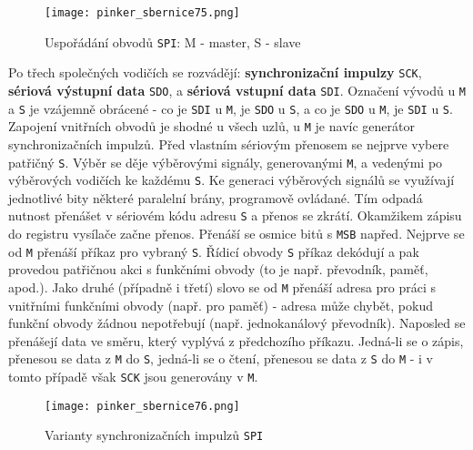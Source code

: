         \begin{figure}[ht!] %
          \centering
          \texttt{[image: pinker\_sbernice75.png]}
          \caption{Uspořádání obvodů \texttt{SPI}: M - master, S - slave}
          \label{MIT:fig_sbernice75}
        \end{figure}
        
        Po třech společných vodičích se rozvádějí: \textbf{synchronizační impulzy} \texttt{SCK}, 
        \textbf{sériová výstupní data} \texttt{SDO}, a \textbf{sériová vstup\-ní data} 
        \texttt{SDI}. Označení vývodů u \texttt{M} a \texttt{S} je vzájemně obrácené - co je
        \texttt{SDI} u \texttt{M}, je \texttt{SDO} u \texttt{S}, a co je \texttt{SDO} u \texttt{M},
        je \texttt{SDI} u \texttt{S}. Zapojení vnitřních obvodů je shodné u všech uzlů, u \texttt{M}
        je navíc generátor synchronizačních impulzů.  Před vlastním sériovým přenosem se nejprve
        vybere patřičný \texttt{S}. Výběr se děje výběrovými signály, generovanými \texttt{M}, a
        vedenými po výběrových vodičích ke každému \texttt{S}. Ke generaci výběrových signálů se
        využívají jednotlivé bity některé paralelní brány, programově ovládané. Tím odpadá nutnost
        přenášet v sériovém kódu adresu \texttt{S} a přenos se zkrátí. Okamžikem zápisu do registru
        vysílače začne přenos. Přenáší se osmice bitů s \texttt{MSB} napřed. Nejprve se od
        \texttt{M} přenáší příkaz pro vybraný \texttt{S}. Řídicí obvody \texttt{S} příkaz dekódují a
        pak provedou patřičnou akci s funkčními obvody (to je např. převodník, paměť, apod.). Jako
        druhé (případně i třetí) slovo se od \texttt{M} přenáší adresa pro práci s vnitřními
        funkčními obvody (např. pro paměť) - adresa může chybět, pokud funkční obvody žádnou
        nepotřebují (např. jednokanálový převodník). Naposled se přenášejí data ve směru, který
        vyplývá z předchozího příkazu. Jedná-li se o zápis, přenesou se data z 
        \texttt{M} do \texttt{S}, jedná-li se o čtení, přenesou se data z \texttt{S} do \texttt{M} 
        - i v tomto případě však \texttt{SCK} jsou generovány v \texttt{M}.

        \begin{figure}[ht!] %
          \centering
          \texttt{[image: pinker\_sbernice76.png]}
          \caption{Varianty synchronizačních impulzů \texttt{SPI}}
          \label{MIT:fig_sbernice76}
        \end{figure}
        
